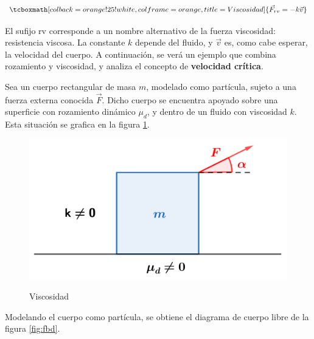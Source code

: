 \documentclass{article}
\begin{document}
\begin{equation}
\tcboxmath[colback=orange!25!white,colframe=orange,title=Viscosidad]{
\vec{F}_{rv} = -k \vec{v}
}
\end{equation}

El sufijo rv corresponde a un nombre alternativo de la fuerza viscosidad: resistencia viscosa. La constante $k$ depende del fluido, y $\vec{v}$ es, como cabe esperar, la velocidad del cuerpo. A continuación, se verá un ejemplo que combina rozamiento y viscosidad, y analiza el concepto de \textbf{velocidad crítica}.

Sea un cuerpo rectangular de masa $m$, modelado como partícula, sujeto a una fuerza externa conocida $\vec{F}$. Dicho cuerpo se encuentra apoyado sobre una superficie con rozamiento dinámico $\mu_{d}$, y dentro de un fluido con viscosidad $k$. Esta situación se grafica en la figura \ref{fig:viscosity}.

\begin{figure}[ht]
\centering
\caption{Viscosidad}
\includegraphics[scale=1.0]{../../common/img/62.01/theory/07-dynamics-viscosity-example.png}
\label{fig:viscosity}
\end{figure}

Modelando el cuerpo como partícula, se obtiene el diagrama de cuerpo libre de la figura \ref{fig:fbd}.
\end{document}
